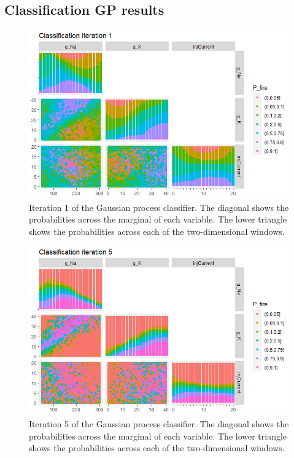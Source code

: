 \documentclass{article}
\begin{document}
\subsection{Classification GP results}
\begin{figure}
    \centering
    \includegraphics[width=\linewidth]{Example1/class1.png}
    \caption{Iteration 1 of the Gaussian process classifier. The diagonal shows the probabilities across the marginal of each variable. The lower triangle shows the probabilities across each of the two-dimensional windows.}
    \label{fig:ex1-class1}
\end{figure}

\begin{figure}
    \centering
    \includegraphics[width=\linewidth]{Example1/class5.png}
    \caption{Iteration 5 of the Gaussian process classifier. The diagonal shows the probabilities across the marginal of each variable. The lower triangle shows the probabilities across each of the two-dimensional windows.}
    \label{fig:ex1-class5}
\end{figure}
\end{document}
